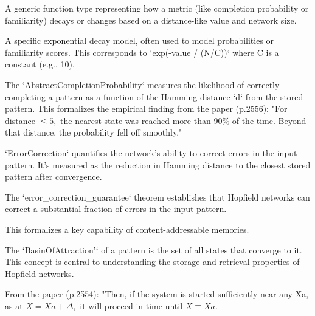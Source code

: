 \begin{definition}\label{MetricDecayFunction}
\leanok
A generic function type representing how a metric (like completion probability or familiarity)
decays or changes based on a distance-like value and network size.
\end{definition}

\begin{definition}\label{ExponentialDecayMetric}
\leanok
A specific exponential decay model, often used to model probabilities or familiarity scores.
This corresponds to `exp(-value / (N/C))` where C is a constant (e.g., 10).
\end{definition}

\begin{definition}\label{AbstractCompletionProbability}
\leanok
The `AbstractCompletionProbability` measures the likelihood of correctly completing a pattern
as a function of the Hamming distance `d` from the stored pattern.
This formalizes the empirical finding from the paper (p.2556):
"For distance $\leq 5,$ the nearest state was reached more than 90\% of the time.
Beyond that distance, the probability fell off smoothly."
\end{definition}

\begin{definition}\label{ErrorCorrection}
`ErrorCorrection` quantifies the network's ability to correct errors in the input pattern.
It's measured as the reduction in Hamming distance to the closest stored pattern after convergence.
\leanok
\end{definition}

\begin{definition}\label{error_correction_guarantee}
\leanok
The `error\_correction\_guarantee` theorem establishes that Hopfield networks
can correct a substantial fraction of errors in the input pattern.

This formalizes a key capability of content-addressable memories.
\end{definition}

\begin{definition}\label{BasinOfAttraction'}
\leanok
The `BasinOfAttraction'` of a pattern is the set of all states that converge to it.
This concept is central to understanding the storage and retrieval properties of Hopfield networks.

From the paper (p.2554): "Then, if the system is started sufficiently near any Xa,
as at $X = Xa + \Delta,$ it will proceed in time until $X \equiv Xa.$
\end{definition}

